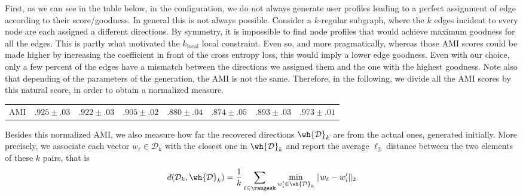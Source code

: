 First, as we can see in the table below, in the  configuration, we do not always
generate user profiles leading to a perfect assignment of edge according to their score/goodness. In
general this is not always possible. Consider a $k$-regular subgraph, where the $k$ edges incident
to every node are each assigned a different directions. By symmetry, it is impossible to find node
profiles that would achieve maximum goodness for all the edges. This is partly what motivated the
$k_{\mathrm{local}}$ local constraint. Even so, and more pragmatically, whereas those AMI scores
could be made higher by increasing the coefficient in front of the cross entropy loss, this would
imply a lower edge goodness. Even with our choice, only a few percent of the edges have a mismatch
between the directions we assigned them and the one with the highest goodness. Note also that
depending of the parameters of the generation, the AMI is not the same. Therefore, in the following,
we divide all the AMI scores by this natural score, in order to obtain a normalized measure.
\newline\vspace{.5\baselineskip}\noindent%
\begin{tabular}{lccccccc}
  \toprule
  {}  & {\smallk{}}    & {{}}   & {\largek{}}    & {\smallo{}}    & {\largeo{}}    & {\fdirs{}}     & {\larged{}}    \\
  \midrule
  AMI & $.925 \pm .03$ & $.922 \pm .03$ & $.905 \pm .02$ & $.880 \pm .04$ & $.874 \pm .05$ & $.893 \pm .03$ & $.973 \pm .01$ \\
  \bottomrule
\end{tabular}
\vspace{.5\baselineskip}

Besides this normalized AMI, we also measure how far the recovered directions $\mathcal{\wh{D}}_k$
are from the actual ones, generated initially. More precisely, we associate each vector $w_\ell \in
\mathcal{D}_k$ with the closest one in $\mathcal{\wh{D}}_k$ and report the average $\ell_2$ distance
between the two elements of these $k$ pairs, that is 
\begin{equation*}
  d(\mathcal{D}_k, \mathcal{\wh{D}}_k) =
  \frac{1}{k} \sum_{\ell \in \rangesk} \min_{w'_i \in \mathcal{\wh{D}}_k} \| w_\ell - w'_i \|_2
\end{equation*}


